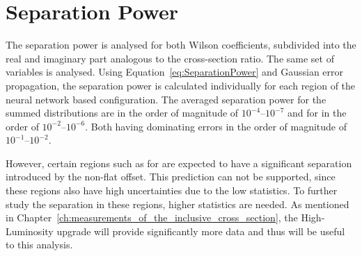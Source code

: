 \documentclass[bachelor,oneside, BCOR10mm,
			ngerman,english  %
]{GAUBM}
\begin{document}
\section{Separation Power}
\label{sec:SeparationPower}
The separation power is analysed for both Wilson coefficients, subdivided into the real and imaginary part analogous to the cross-section ratio. The same set of variables is analysed. Using Equation~\ref{eq:SeparationPower} and Gaussian error propagation, the separation power is calculated individually for each region of the neural network based configuration. The averaged separation power for the summed distributions  \ctB are in the order of magnitude of $10^{-4}$--$10^{-7}$ and for \ctW in the order of $10^{-2}$--$10^{-6}$. Both having dominating errors in the order of magnitude of $10^{-1}$--$10^{-2}$.

However, certain regions such as for \cosstar are expected to have a significant separation introduced by the non-flat offset. This prediction can not be supported, since these regions also have high uncertainties due to the low statistics. To further study the separation in these regions, higher statistics are needed. As mentioned in Chapter~\ref{ch:measurements_of_the_inclusive_cross_section}, the High-Luminosity upgrade will provide significantly more data and thus will be useful to this analysis.
\end{document}
